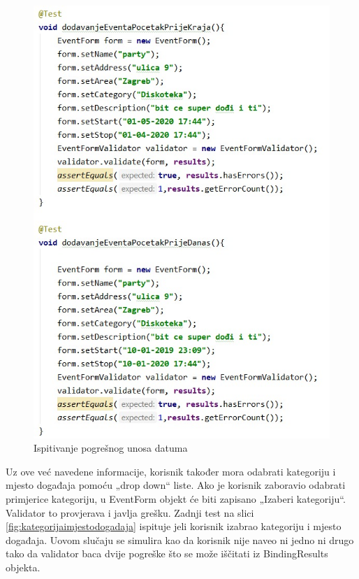 \begin{figure}[H]
	\includegraphics[scale=0.6]{slike/pogresan_unos_datuma.jpeg}
	\centering
	\caption{Ispitivanje pogrešnog unosa datuma}
	\label{fig:pogresanunosdatuma}
\end{figure}

\normalfont Uz ove već navedene informacije, korisnik također mora odabrati kategoriju i mjesto događaja pomoću „drop down“ liste. Ako je korisnik zaboravio odabrati primjerice kategoriju, u EventForm objekt će biti zapisano „Izaberi kategoriju“. Validator to provjerava i javlja grešku. Zadnji test na slici \ref{fig:kategorijaimjestodogadaja} ispituje jeli korisnik izabrao kategoriju i mjesto događaja. Uovom slučaju se simulira kao da korisnik nije naveo ni jedno ni drugo tako da validator baca dvije pogreške što se može iščitati iz BindingResults objekta.

